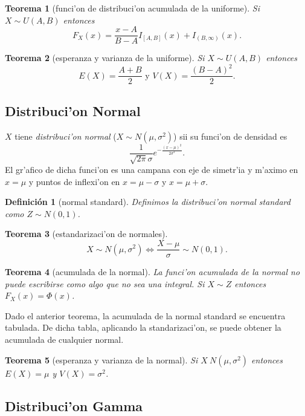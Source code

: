 \documentclass[a4paper,spanish]{article}
\newtheorem{teo}{Teorema}
\newtheorem{defi}{Definici\'on}
\begin{document}
\begin{teo}[funci'on de distribuci'on acumulada de la uniforme]
Si $X \sim U(A,B)$ entonces
$$F_X(x) = \frac{x-A}{B-A} I_{[A,B]}(x) + I_{(B,\infty)}(x).$$
\end{teo}

\begin{teo}[esperanza y varianza de la uniforme]
Si $X \sim U(A,B)$ entonces 
$$E(X) = \frac{A+B}{2} \mbox{\ \ y\ \ } V(X) = \frac{(B-A)^2}{2}.$$
\end{teo}

\subsection{Distribuci'on Normal}

$X$ tiene \emph{distribuci'on normal} ($X \sim N(\mu,\sigma^2)$) sii su 
funci'on de densidad es
$$\frac{1}{\sqrt{2 \pi} \sigma} 
	e ^ {\displaystyle -\frac{(x-\mu)^2}{2 \sigma^2}}.$$
El gr'afico de dicha funci'on es una campana con eje de simetr'ia y m'aximo en
$x = \mu$ y puntos de inflexi'on en $x = \mu-\sigma$ y $x = \mu+\sigma$.

\begin{defi}[normal standard]
Definimos la distribuci'on \emph{normal standard} como $Z \sim N(0,1)$.
\end{defi}

\begin{teo}[estandarizaci'on de normales]
$$X \sim N(\mu,\sigma^2) \Leftrightarrow \frac{X-\mu}{\sigma} \sim N(0,1).$$
\end{teo}

\begin{teo}[acumulada de la normal]
La funci'on acumulada de la normal no puede escribirse como algo que no sea
una integral. Si $X \sim Z$ entonces $F_X(x) = \Phi(x)$.
\end{teo}
Dado el anterior teorema, la acumulada de la normal standard se encuentra
tabulada. De dicha tabla, aplicando la standarizaci'on, se puede obtener
la acumulada de cualquier normal.

\begin{teo}[esperanza y varianza de la normal]
Si $X ~ N(\mu,\sigma^2)$ entonces $E(X) = \mu$ y $V(X) = \sigma^2$.
\end{teo}

\subsection{Distribuci'on Gamma}
\end{document}
